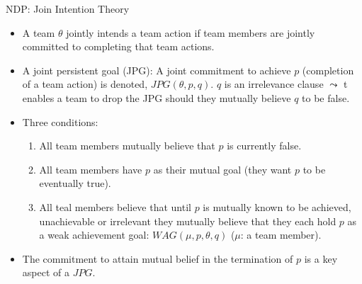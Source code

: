 \documentclass[9pt]{beamer}
\begin{document}
\begin{frame}{NDP: Join Intention Theory}
\begin{small}

\begin{itemize}
\item  A team $\theta$ jointly intends a team action if team members are jointly committed to completing that team actions.
\item A \textcolor{CS-1light}{joint persistent goal (JPG)}: A joint commitment to achieve $p$ (completion of a team action) is denoted, $JPG(\theta, p,q)$. $q$ is an irrelevance clause $\leadsto$ t enables a team to drop the JPG should they mutually believe $q$ to be false.
\item Three conditions:
\begin{enumerate}
\small 
\item All team members mutually believe that $p$ is currently false.
\item All team members have $p$ as their mutual goal (they want $p$ to be eventually true).
\item All teal members believe that until $p$ is mutually known to be achieved, unachievable or irrelevant they mutually believe that they each hold $p$ as a weak achievement goal: $WAG(\mu,p, \theta, q )$ ($\mu $: a team member).
\end{enumerate}
\item The commitment to attain mutual belief in the termination of $p$ is a key aspect of a $JPG$.
\end{itemize}

\end{small}
\end{frame}
\end{document}
